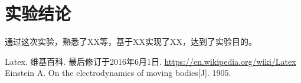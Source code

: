 \documentclass[a4paper, 12pt]{article}
\begin{document}
\section{实验结论}

通过这次实验，熟悉了XX等，基于XX实现了XX，达到了实验目的。


\renewcommand{\refname}{参考}
\begin{thebibliography}{9}
     Latex. 维基百科. 最后修订于2016年6月1日. \url{https://en.wikipedia.org/wiki/Latex}
     Einstein A. On the electrodynamics of moving bodies[J]. 1905.
\end{thebibliography}
\end{document}
